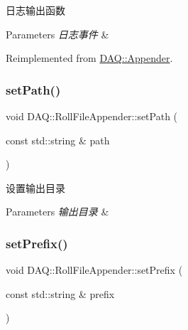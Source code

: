 日志输出函数 


\begin{DoxyParams}{Parameters}
{\em 日志事件} & \\
\hline
\end{DoxyParams}


Reimplemented from \hyperlink{classDAQ_1_1Appender_a49ebbcec4d879ba461080479fa1085aa}{D\+A\+Q\+::\+Appender}.

\mbox{\label{classDAQ_1_1RollFileAppender_a61d55f46b0226a36a7f33fa6580525ab}} 
\subsubsection{\texorpdfstring{set\+Path()}{setPath()}}
{\footnotesize\ttfamily void D\+A\+Q\+::\+Roll\+File\+Appender\+::set\+Path (\begin{DoxyParamCaption}\item[{const std\+::string \&}]{path }\end{DoxyParamCaption})\hspace{0.3cm}{\ttfamily [inline]}}



设置输出目录 


\begin{DoxyParams}{Parameters}
{\em 输出目录} & \\
\hline
\end{DoxyParams}
\mbox{\label{classDAQ_1_1RollFileAppender_a068d8104f4c0ac82feadfd23520b402e}} 
\subsubsection{\texorpdfstring{set\+Prefix()}{setPrefix()}}
{\footnotesize\ttfamily void D\+A\+Q\+::\+Roll\+File\+Appender\+::set\+Prefix (\begin{DoxyParamCaption}\item[{const std\+::string \&}]{prefix }\end{DoxyParamCaption})\hspace{0.3cm}{\ttfamily [inline]}}



